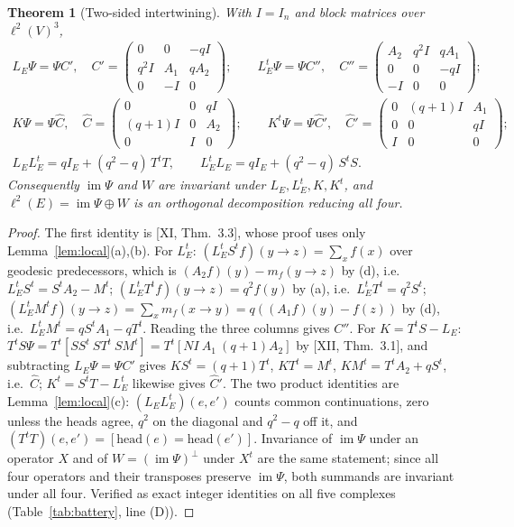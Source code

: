 \documentclass[11pt]{amsart}
\numberwithin{equation}{section}
\newtheorem{theorem}{Theorem}[section]
\theoremstyle{definition}
\theoremstyle{remark}
\newcommand{\LE}{L_E}
\newcommand{\im}{\operatorname{im}}
\newcommand{\Ch}{\widehat C}
\newcommand{\Chp}{\widehat C{}'}
\newcommand{\Cpp}{C''}
\begin{document}
\begin{theorem}[Two-sided intertwining]\label{thm:two}
With $I=I_n$ and block matrices over $\ell^{2}(V)^{3}$,
\begin{gather*}
\LE\Psi=\Psi C',\quad C'=\begin{pmatrix}0&0&-qI\\ q^{2}I&A_1&qA_2\\0&-I&0\end{pmatrix};\qquad
\LE^{t}\Psi=\Psi\Cpp,\quad \Cpp=\begin{pmatrix}A_2&q^{2}I&qA_1\\0&0&-qI\\-I&0&0\end{pmatrix};\\
K\Psi=\Psi\Ch,\quad \Ch=\begin{pmatrix}0&0&qI\\(q{+}1)I&0&A_2\\0&I&0\end{pmatrix};\qquad
K^{t}\Psi=\Psi\Chp,\quad \Chp=\begin{pmatrix}0&(q{+}1)I&A_1\\0&0&qI\\I&0&0\end{pmatrix};\\
\LE\LE^{t}=qI_E+(q^{2}-q)\,T^{t}T,\qquad \LE^{t}\LE=qI_E+(q^{2}-q)\,S^{t}S .
\end{gather*}
Consequently $\im\Psi$ and $W$ are invariant under $\LE,\LE^{t},K,K^{t}$, and
$\ell^{2}(E)=\im\Psi\oplus W$ is an orthogonal decomposition reducing all four.
\end{theorem}

\begin{proof}
The first identity is [XI, Thm.~3.3], whose proof uses only Lemma~\ref{lem:local}(a),(b).
For $\LE^{t}$: $(\LE^{t}S^{t}f)(y\to z)=\sum_{x}f(x)$ over geodesic predecessors, which is
$(A_2f)(y)-m_f(y\to z)$ by (d), i.e.\ $\LE^{t}S^{t}=S^{t}A_2-M^{t}$; $(\LE^{t}T^{t}f)(y\to z)=q^{2}f(y)$
by (a), i.e.\ $\LE^{t}T^{t}=q^{2}S^{t}$; $(\LE^{t}M^{t}f)(y\to z)=\sum_xm_f(x\to y)=q((A_1f)(y)-f(z))$
by (d), i.e.\ $\LE^{t}M^{t}=qS^{t}A_1-qT^{t}$. Reading the three columns gives $\Cpp$. For
$K=T^{t}S-\LE$: $T^{t}S\Psi=T^{t}[SS^{t}\ ST^{t}\ SM^{t}]=T^{t}[NI\ A_1\ (q{+}1)A_2]$ by
[XII, Thm.~3.1], and subtracting $\LE\Psi=\Psi C'$ gives $KS^{t}=(q{+}1)T^{t}$, $KT^{t}=M^{t}$,
$KM^{t}=T^{t}A_2+qS^{t}$, i.e.\ $\Ch$; $K^{t}=S^{t}T-\LE^{t}$ likewise gives $\Chp$. The two
product identities are Lemma~\ref{lem:local}(c): $(\LE\LE^{t})(e,e')$ counts common
continuations, zero unless the heads agree, $q^{2}$ on the diagonal and $q^{2}-q$ off it, and
$(T^{t}T)(e,e')=[\text{head}(e)=\text{head}(e')]$. Invariance of $\im\Psi$ under an operator
$X$ and of $W=(\im\Psi)^{\perp}$ under $X^{t}$ are the same statement; since all four
operators and their transposes preserve $\im\Psi$, both summands are invariant under all
four. Verified as exact integer identities on all five complexes (Table~\ref{tab:battery},
line (D)).
\end{proof}
\end{document}
